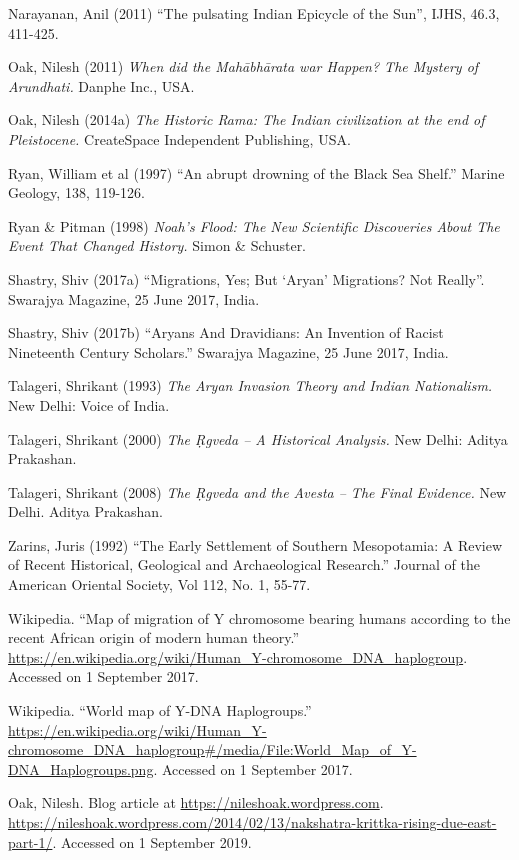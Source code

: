 \begin{thebibliography}{99}
  Narayanan, Anil (2011) “The pulsating Indian Epicycle of the Sun”, IJHS, 46.3, 411-425.

  Oak, Nilesh (2011) \textit{When did the Mahābhārata war Happen? The Mystery of Arundhati.} Danphe Inc., USA.

  Oak, Nilesh (2014a) \textit{The Historic Rama: The Indian civilization at the end of Pleistocene.} CreateSpace Independent Publishing, USA.

  Ryan, William et al (1997) “An abrupt drowning of the Black Sea Shelf.” Marine Geology, 138, 119-126.

  Ryan \& Pitman (1998) \textit{Noah’s Flood: The New Scientific Discoveries About The Event That Changed History.} Simon \& Schuster.

  Shastry, Shiv (2017a) “Migrations, Yes; But ‘Aryan’ Migrations? Not Really”. Swarajya Magazine, 25 June 2017, India.
 
  Shastry, Shiv (2017b) “Aryans And Dravidians: An Invention of Racist Nineteenth Century Scholars.” Swarajya Magazine, 25 June 2017, India.

  Talageri, Shrikant (1993) \textit{The Aryan Invasion Theory and Indian Nationalism.} New Delhi: Voice of India.

  Talageri, Shrikant (2000) \textit{The Ṛgveda – A Historical Analysis.} New Delhi: Aditya Prakashan.

  Talageri, Shrikant (2008) \textit{The Ṛgveda and the Avesta – The Final Evidence.} New Delhi. Aditya Prakashan.
 
  Zarins, Juris (1992) “The Early Settlement of Southern Mesopotamia: A Review of Recent Historical, Geological and Archaeological Research.” Journal of the American Oriental Society, Vol 112, No. 1, 55-77.

  Wikipedia. “Map of migration of Y chromosome bearing humans according to the recent African origin of modern human theory.” \url{https://en.wikipedia.org/wiki/Human_Y-chromosome_DNA_haplogroup}. Accessed on 1 September 2017.

  Wikipedia. “World map of Y-DNA Haplogroups.” \url{https://en.wikipedia.org/wiki/Human_Y-chromosome_DNA_haplogroup#/media/File:World_Map_of_Y-DNA_Haplogroups.png}. Accessed on 1 September 2017.

  Oak, Nilesh. Blog article at \url{https://nileshoak.wordpress.com}. \url{https://nileshoak.wordpress.com/2014/02/13/nakshatra-krittka-rising-due-east-part-1/}. Accessed on 1 September 2019.


\end{thebibliography}
